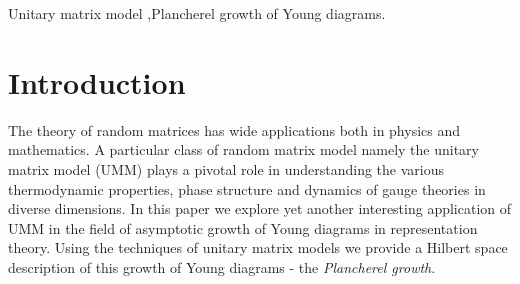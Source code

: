 \documentclass[final,3p,12pt,times]{elsarticle}
\numberwithin{equation}{section}
\begin{document}
\begin{frontmatter}
\begin{abstract}
Growth of Young diagrams, equipped with Plancherel measure, follows the automodel equation of Kerov. Using the technology of unitary matrix model we show that such growth process is exactly same as the growth of gap-less phase in Gross-Witten and Wadia (GWW) model. The \emph{limit shape} of asymptotic Young diagrams corresponds to GWW transition point. Our analysis also offers an alternate proof of \emph{limit shape} theorem of Vershik-Kerov and Logan-Shepp. Using the connection between unitary matrix model and free Fermi droplet description, we map the Young diagrams in automodel class to different shapes of two dimensional phase space droplets. Quantising these droplets we further set up a correspondence between automodel diagrams and coherent states in the Hilbert space. Thus growth of Young diagrams are mapped to evolution of coherent states in the Hilbert space. Gaussian fluctuations of large \emph{N} Young diagrams are also mapped to quantum (large \emph{N}) fluctuations of the coherent states.

\end{abstract}
		
\begin{keyword}
Unitary matrix model \sep Plancherel growth of Young diagrams.
\end{keyword}

\end{frontmatter}


\tableofcontents


\section{Introduction}
\label{sec:intro}

The theory of random matrices has wide applications both in physics and mathematics. A particular class of random matrix model namely the unitary matrix model (UMM) plays a pivotal role in understanding the various thermodynamic properties, phase structure  and dynamics of gauge theories in diverse dimensions. In this paper we explore yet another interesting application of UMM in the field of asymptotic growth of Young diagrams in representation theory. Using the techniques of unitary matrix models we provide a Hilbert space description of this growth of Young diagrams - the \emph{Plancherel growth}.
\end{document}
